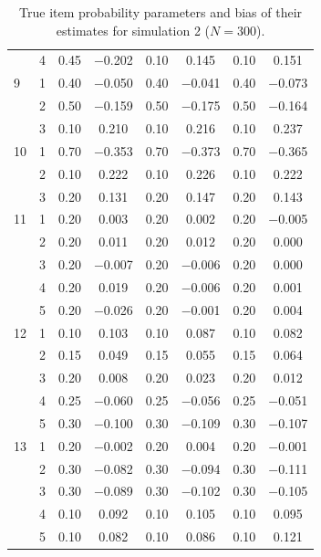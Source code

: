 \begin{table}[H]
\begin{tabular}{llcccccc}
   & 4 & 0.45 & $-$0.202 & 0.10 & 0.145 & 0.10 & 0.151 \\ 
  9 & 1 & 0.40 & $-$0.050 & 0.40 & $-$0.041 & 0.40 & $-$0.073 \\ 
   & 2 & 0.50 & $-$0.159 & 0.50 & $-$0.175 & 0.50 & $-$0.164 \\ 
   & 3 & 0.10 & 0.210 & 0.10 & 0.216 & 0.10 & 0.237 \\ 
  10 & 1 & 0.70 & $-$0.353 & 0.70 & $-$0.373 & 0.70 & $-$0.365 \\ 
   & 2 & 0.10 & 0.222 & 0.10 & 0.226 & 0.10 & 0.222 \\ 
   & 3 & 0.20 & 0.131 & 0.20 & 0.147 & 0.20 & 0.143 \\ 
  11 & 1 & 0.20 & 0.003 & 0.20 & 0.002 & 0.20 & $-$0.005 \\ 
   & 2 & 0.20 & 0.011 & 0.20 & 0.012 & 0.20 & 0.000 \\ 
   & 3 & 0.20 & $-$0.007 & 0.20 & $-$0.006 & 0.20 & 0.000 \\ 
   & 4 & 0.20 & 0.019 & 0.20 & $-$0.006 & 0.20 & 0.001 \\ 
   & 5 & 0.20 & $-$0.026 & 0.20 & $-$0.001 & 0.20 & 0.004 \\ 
  12 & 1 & 0.10 & 0.103 & 0.10 & 0.087 & 0.10 & 0.082 \\ 
   & 2 & 0.15 & 0.049 & 0.15 & 0.055 & 0.15 & 0.064 \\ 
   & 3 & 0.20 & 0.008 & 0.20 & 0.023 & 0.20 & 0.012 \\ 
   & 4 & 0.25 & $-$0.060 & 0.25 & $-$0.056 & 0.25 & $-$0.051 \\ 
   & 5 & 0.30 & $-$0.100 & 0.30 & $-$0.109 & 0.30 & $-$0.107 \\ 
  13 & 1 & 0.20 & $-$0.002 & 0.20 & 0.004 & 0.20 & $-$0.001 \\ 
   & 2 & 0.30 & $-$0.082 & 0.30 & $-$0.094 & 0.30 & $-$0.111 \\ 
   & 3 & 0.30 & $-$0.089 & 0.30 & $-$0.102 & 0.30 & $-$0.105 \\ 
   & 4 & 0.10 & 0.092 & 0.10 & 0.105 & 0.10 & 0.095 \\ 
   & 5 & 0.10 & 0.082 & 0.10 & 0.086 & 0.10 & 0.121 \\ 
   \bottomrule
\end{tabular}
\caption{True item probability parameters and bias of their estimates for simulation 2 ($N = 300$).} 
\label{table:sim2_item_prob_bias_N300}
\end{table}
